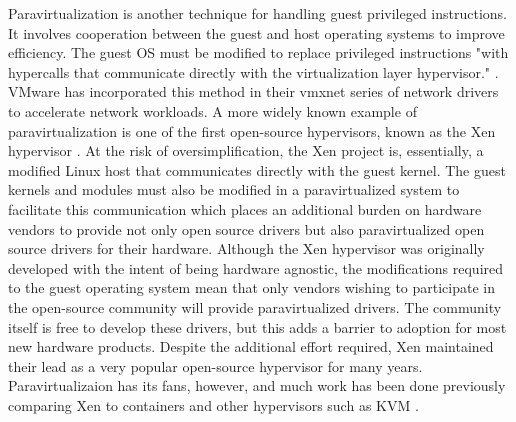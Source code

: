 Paravirtualization is another technique for handling guest privileged instructions.
It involves cooperation between the guest and host operating systems to improve efficiency.
The guest OS must be modified to replace privileged instructions "with hypercalls that communicate directly with the virtualization layer hypervisor." \autocite{vmwareVT}.
VMware has incorporated this method in their vmxnet series of network drivers to accelerate network workloads.
A more widely known example of paravirtualization is one of the first open-source hypervisors, known as the Xen hypervisor \autocite{_barham_1}.
At the risk of oversimplification, the Xen project is, essentially, a modified Linux host that communicates directly with the guest kernel.
The guest kernels and modules must also be modified in a paravirtualized system to facilitate this communication which places an additional burden on hardware vendors to provide not only open source drivers but also paravirtualized open source drivers for their hardware.
Although the Xen hypervisor was originally developed with the intent of being hardware agnostic, the modifications required to the guest operating system mean that only vendors wishing to participate in the open-source community will provide paravirtualized drivers.
The community itself is free to develop these drivers, but this adds a barrier to adoption for most new hardware products.
Despite the additional effort required, Xen maintained their lead as a very popular open-source hypervisor for many years.
Paravirtualizaion has its fans, however, and much work has been done previously comparing Xen to containers and other hypervisors such as KVM \autocite{_felter_1, _younge_1, wangAmazon2010, _che_1, _scheepers_1, wangAllocation2007, rathore2013kvm}.

